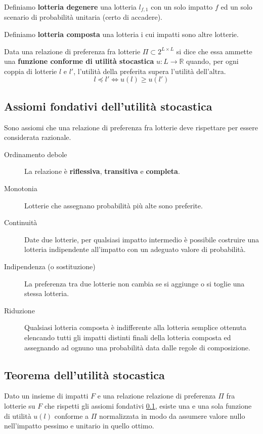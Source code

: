 \documentclass[\main/main.tex]{subfiles}
\begin{document}
\begin{definition}
  Definiamo \textbf{lotteria degenere} una lotteria $l_{f,1}$ con un solo impatto $f$ ed un solo scenario di probabilità unitaria (certo di accadere).
\end{definition}

\begin{definition}
  Definiamo \textbf{lotteria composta} una lotteria i cui impatti sono altre lotterie.
\end{definition}

\begin{definition}
  Data una relazione di preferenza fra lotterie $\Pi \subset 2^{L \times L}$ si dice che essa ammette una \textbf{funzione conforme di utilità stocastica} $u: L \rightarrow \mathbb{R}$ quando, per ogni coppia di lotterie $l$ e $l'$, l'utilità della preferita supera l'utilità dell'altra.
  \[
    l \preceq l' \Leftrightarrow u(l) \geq u(l')
  \]
\end{definition}

\subsection{Assiomi fondativi dell'utilità stocastica} \label{assiomi_fondativi}
Sono assiomi che una relazione di preferenza fra lotterie deve rispettare per essere considerata razionale.

\begin{description}
  \item[Ordinamento debole] La relazione è \textbf{riflessiva}, \textbf{transitiva} e \textbf{completa}.
  \item[Monotonia] Lotterie che assegnano probabilità più alte sono preferite.
  \item[Continuità] Date due lotterie, per qualsiasi impatto intermedio è possibile costruire una lotteria indipendente all'impatto con un adeguato valore di probabilità.
  \item[Indipendenza (o sostituzione)] La preferenza tra due lotterie non cambia se si aggiunge o si toglie una stessa lotteria.
  \item[Riduzione] Qualsiasi lotteria composta è indifferente alla lotteria semplice ottenuta elencando tutti gli impatti distinti finali della lotteria composta ed assegnando ad ognuno una probabilità data dalle regole di composizione.
\end{description}

\subsection{Teorema dell'utilità stocastica}
\begin{theorem}
  Dato un insieme di impatti $F$ e una relazione relazione di preferenza $\Pi$ fra lotterie su $F$ che rispetti gli assiomi fondativi \ref{assiomi_fondativi}, esiste una e una sola funzione di utilità $u(l)$ conforme a $\Pi$ normalizzata in modo da assumere valore nullo nell'impatto pessimo e unitario in quello ottimo.
\end{theorem}
\end{document}
